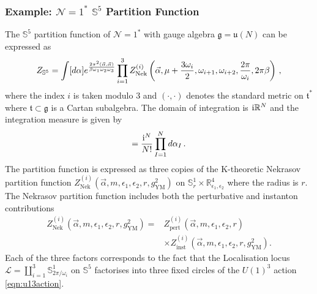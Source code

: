 \documentclass[main.tex]{subfiles}
\begin{document}
\subsubsection{Example: \texorpdfstring{$\mathcal{N}=1^*$}{N=1*} \texorpdfstring{$\mathbb{S}^5$}{S5} Partition Function}\label{Chap:AppS5part}
The $\mathbb{S}^5$ partition function of $\mathcal{N}=1^*$ with gauge algebra $\mathfrak{g}=\mathfrak{u}(N)$ can be expressed as \cite{Kim:2012ava,Lockhart:2012vp,Bullimore:2014upa,Kim:2016usy,Kim:2012qf,Kim:2013nva}
\begin{equation}\label{eqn:S5partition}
Z_{\mathbb{S}^5}=\int[d \alpha]e^{\frac{2\pi^2(\vec{\alpha},\vec{\alpha})}{\beta\omega_1\omega_2\omega_3}}\prod_{i=1}^3Z^{(i)}_{\text{Nek}}\left(\vec{\alpha},\mu+\frac{3\omega_i}{2},\omega_{i+1},\omega_{i+2},\frac{2\pi}{\omega_i},2\pi\beta\right)\,,
\end{equation}
where the index $i$ is taken modulo $3$ and $(\cdot,\cdot)$ denotes the standard metric on $\mathfrak{t}^*$ where $\mathfrak{t}\subset\mathfrak{g}$ is a Cartan subalgebra.  The domain of integration is $\mathrm{i}\mathbb{R}^N$ and the integration measure is given by
\begin{equation}
[\extd \alpha]=\frac{\iu^{N}}{N!}\prod_{I=1}^N\extd \alpha_I\,.
\end{equation}
The partition function is expressed as three copies of the K-theoretic Nekrasov partition function $Z^{(i)}_{\text{Nek}}(\vec{\alpha},m,\epsilon_1,\epsilon_2,r,g^2_{\text{YM}})$ on $\mathbb{S}_r^1\times\mathbb{R}^4_{\epsilon_1,\epsilon_2}$ where the radius is $r$.  The Nekrasov partition function includes both the perturbative and instanton contributions 
\begin{equation}\label{eqn:Nekdecomp}
\begin{aligned}
Z^{(i)}_{\text{Nek}}(\vec{\alpha},m,\epsilon_1,\epsilon_2,r,g^2_{\text{YM}})=&Z^{(i)}_{\text{pert}}(\vec{\alpha},m,\epsilon_1,\epsilon_2,r)\\
&\times Z^{(i)}_{\text{inst}}(\vec{\alpha},m,\epsilon_1,\epsilon_2,r,g^2_{\text{YM}}).
\end{aligned}
\end{equation}
Each of the three factors corresponds to the fact that the Localisation locus $\mathcal{L}=\coprod_{i=1}^3 \mathbb{S}^1_{2\pi/\omega_i}$ on $\mathbb{S}^5$ factorises into three fixed circles of the $U(1)^3$ action \eqref{eqn:u13action}.  
\end{document}
